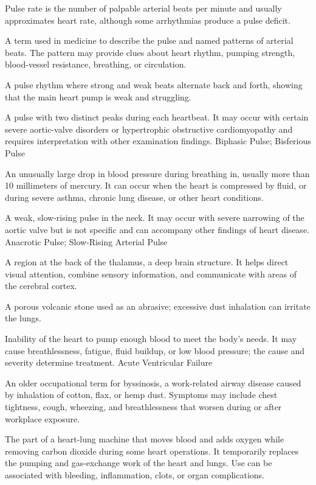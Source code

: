  Pulse rate is the number of palpable arterial beats per minute and usually approximates heart rate, although some arrhythmias produce a pulse deficit.

 A term used in medicine to describe the pulse and named patterns of arterial beats. The pattern may provide clues about heart rhythm, pumping strength, blood-vessel resistance, breathing, or circulation.

 A pulse rhythm where strong and weak beats alternate back and forth, showing that the main heart pump is weak and struggling.

 A pulse with two distinct peaks during each heartbeat. It may occur with certain severe aortic-valve disorders or hypertrophic obstructive cardiomyopathy and requires interpretation with other examination findings.
\synonyms
Biphasic Pulse; Bisferious Pulse

 An unusually large drop in blood pressure during breathing in, usually more than 10 millimeters of mercury. It can occur when the heart is compressed by fluid, or during severe asthma, chronic lung disease, or other heart conditions.

 A weak, slow-rising pulse in the neck. It may occur with severe narrowing of the aortic valve but is not specific and can accompany other findings of heart disease.
\synonyms
Anacrotic Pulse; Slow-Rising Arterial Pulse

 A region at the back of the thalamus, a deep brain structure. It helps direct visual attention, combine sensory information, and communicate with areas of the cerebral cortex.

 A porous volcanic stone used as an abrasive; excessive dust inhalation can irritate the lungs.

 Inability of the heart to pump enough blood to meet the body's needs. It may cause breathlessness, fatigue, fluid buildup, or low blood pressure; the cause and severity determine treatment.
\synonyms
Acute Ventricular Failure

 An older occupational term for byssinosis, a work-related airway disease caused by inhalation of cotton, flax, or hemp dust. Symptoms may include chest tightness, cough, wheezing, and breathlessness that worsen during or after workplace exposure.

 The part of a heart-lung machine that moves blood and adds oxygen while removing carbon dioxide during some heart operations. It temporarily replaces the pumping and gas-exchange work of the heart and lungs. Use can be associated with bleeding, inflammation, clots, or organ complications.

